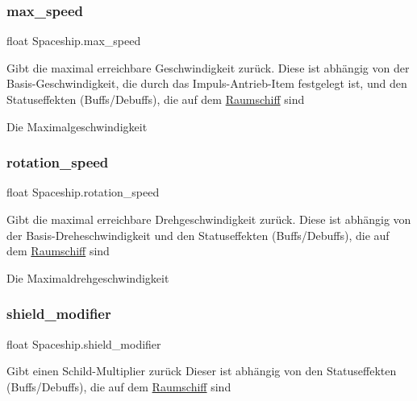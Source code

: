 \subsubsection{\texorpdfstring{max\+\_\+speed}{max\_speed}}
{\footnotesize\ttfamily float Spaceship.\+max\+\_\+speed\hspace{0.3cm}{\ttfamily [get]}}



Gibt die maximal erreichbare Geschwindigkeit zurück. Diese ist abhängig von der Basis-\/\+Geschwindigkeit, die durch das Impuls-\/\+Antrieb-\/\+Item festgelegt ist, und den Statuseffekten (Buffs/\+Debuffs), die auf dem \hyperlink{class_raumschiff}{Raumschiff} sind 

Die Maximalgeschwindigkeit\mbox{\label{class_spaceship_a9dede788e870c34a09db8d22e9ac61f6}} 
\subsubsection{\texorpdfstring{rotation\+\_\+speed}{rotation\_speed}}
{\footnotesize\ttfamily float Spaceship.\+rotation\+\_\+speed\hspace{0.3cm}{\ttfamily [get]}}



Gibt die maximal erreichbare Drehgeschwindigkeit zurück. Diese ist abhängig von der Basis-\/\+Dreheschwindigkeit und den Statuseffekten (Buffs/\+Debuffs), die auf dem \hyperlink{class_raumschiff}{Raumschiff} sind 

Die Maximaldrehgeschwindigkeit\mbox{\label{class_spaceship_a1daf5f7456d1b35b59eb6580b4ad5b9e}} 
\subsubsection{\texorpdfstring{shield\+\_\+modifier}{shield\_modifier}}
{\footnotesize\ttfamily float Spaceship.\+shield\+\_\+modifier\hspace{0.3cm}{\ttfamily [get]}}



Gibt einen Schild-\/\+Multiplier zurück Dieser ist abhängig von den Statuseffekten (Buffs/\+Debuffs), die auf dem \hyperlink{class_raumschiff}{Raumschiff} sind 

